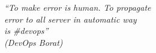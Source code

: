 \begin{epigrafe}
    \vspace*{\fill}
	\begin{flushright}
		\textit{``To make error is human. To propagate \\
                          error to all server in automatic way \\
                          is \#devops''\\
		(DevOps Borat)}
	\end{flushright}
\end{epigrafe}
